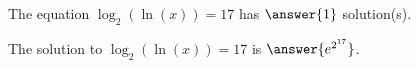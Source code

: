 \documentclass{ximera}
\author{Kenneth Berglund}
\begin{document}
\licenseSZ
\begin{exercise}
The equation $\log_2(\ln(x)) = 17$ has $\answer{1}$ solution(s).

\begin{exercise}
The solution to $\log_2(\ln(x)) = 17$ is $\answer{e^{2^{17}}}$.
\end{exercise}

\end{exercise}
\end{document}
